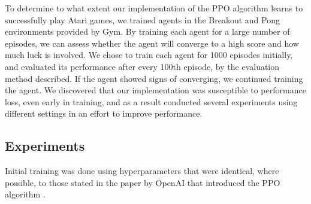 \documentclass[12pt,a4paper]{article}
\begin{document}
To determine to what extent our implementation of the PPO algorithm learns to successfully play Atari games, we trained agents in the Breakout and Pong environments provided by Gym. By training each agent for a large number of episodes, we can assess whether the agent will converge to a high score and how much luck is involved. We chose to train each agent for 1000 episodes initially, and evaluated its performance after every 100th episode, by the evaluation method described. If the agent showed signs of converging, we continued training the agent. We discovered that our implementation was susceptible to performance loss, even early in training, and as a result conducted several experiments using different settings in an effort to improve performance.

\subsection{Experiments}
Initial training was done using hyperparameters that were identical, where possible, to those stated in the paper by OpenAI that introduced the PPO algorithm \cite{DBLP:journals/corr/SchulmanWDRK17}. 
\end{document}
